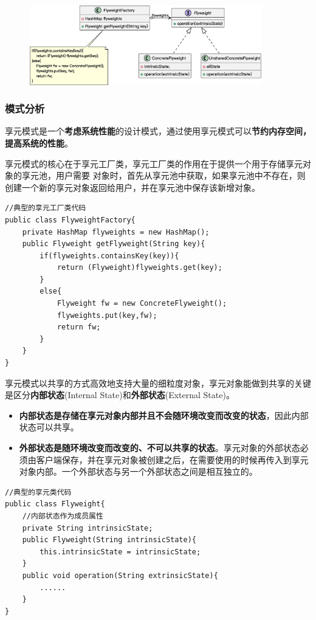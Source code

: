 \begin{figure}[H]
    \vspace{-0.5em}
	\centering
	\includegraphics[width=0.9\textwidth]{images/享元模式结构.eps}
    \vspace{-1em}
\end{figure}

\subsubsection{模式分析}
享元模式是一个\textbf{考虑系统性能}的设计模式，通过使用享元模式可以\textbf{节约内存空间，提高系统的性能}。

享元模式的核心在于享元工厂类，享元工厂类的作用在于提供一个用于存储享元对象的享元池，用户需要 对象时，首先从享元池中获取，如果享元池中不存在，则创建一个新的享元对象返回给用户，并在享元池中保存该新增对象。
\begin{lstlisting}
//典型的享元工厂类代码
public class FlyweightFactory{
    private HashMap flyweights = new HashMap();
    public Flyweight getFlyweight(String key){
        if(flyweights.containsKey(key)){
            return (Flyweight)flyweights.get(key);
        }
        else{
            Flyweight fw = new ConcreteFlyweight();
            flyweights.put(key,fw);
            return fw;
        }
    }
}
\end{lstlisting}

享元模式以共享的方式高效地支持大量的细粒度对象，享元对象能做到共享的关键是区分\textbf{内部状态}(Internal State)和\textbf{外部状态}(External State)。
\begin{itemize}
    \item \textbf{内部状态是存储在享元对象内部并且不会随环境改变而改变的状态}，因此内部状态可以共享。
    \item \textbf{外部状态是随环境改变而改变的、不可以共享的状态}。享元对象的外部状态必须由客户端保存，并在享元对象被创建之后，在需要使用的时候再传入到享元对象内部。一个外部状态与另一个外部状态之间是相互独立的。
\end{itemize}

\begin{lstlisting}
//典型的享元类代码
public class Flyweight{
    //内部状态作为成员属性
    private String intrinsicState;
    public Flyweight(String intrinsicState){
        this.intrinsicState = intrinsicState;
    }
    public void operation(String extrinsicState){
        ......
    }
}
\end{lstlisting}


